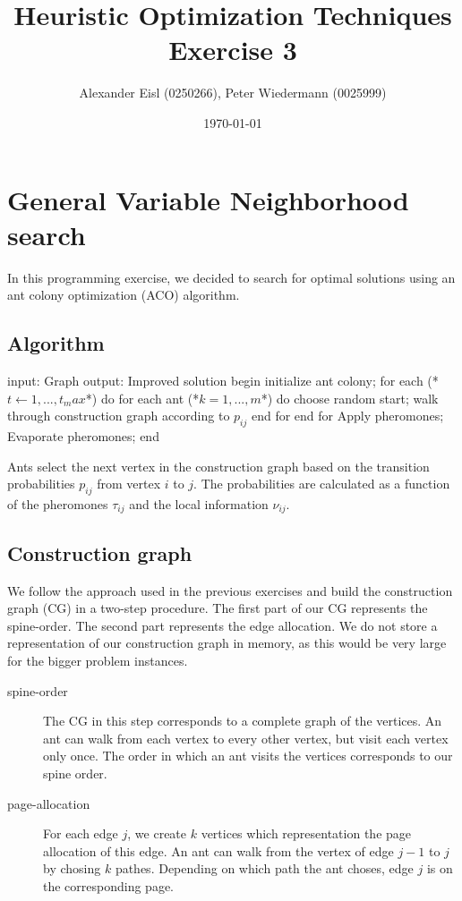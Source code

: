 \documentclass{scrartcl}
\author{Alexander Eisl (0250266), Peter Wiedermann (0025999)}
\date{\today}
\title{Heuristic Optimization Techniques \\ Exercise 3}
\begin{document}
\maketitle


\section{General Variable Neighborhood search}
\label{sec:general_vns}

In this programming exercise, we decided to search for optimal
solutions using an ant colony optimization (ACO) algorithm.


\subsection{Algorithm}

\begin{algorithm}[caption={Local search}]
    input: Graph 
    output: Improved solution
    begin
        initialize ant colony;
        for each (*$t \leftarrow 1,...,t_max$*) do
      	    for each ant (*$k = 1,...,m$*) do
               choose random start;
               walk through construction graph according to $p_{ij}$
            end for
        end for
        Apply pheromones;
        Evaporate pheromones;
    end
\end{algorithm}

Ants select the next vertex in the construction graph based on the
transition probabilities $p_{ij}$ from vertex $i$ to $j$. The
probabilities are calculated as a function of the pheromones
$\tau_{ij}$ and the local information $\nu_{ij}$.



\subsection{Construction graph}
\label{construction_graph}
We follow the approach used in the previous exercises and build the
construction graph (CG) in a two-step procedure. The first part of our
CG represents the spine-order. The second part represents the edge
allocation. We do not store a representation of our construction graph
in memory, as this would be very large for the bigger problem
instances.

\begin{description}
  \item[spine-order] The CG in this step corresponds to a complete
    graph of the vertices. An ant can walk from each vertex to every other vertex, but
    visit each vertex only once. The order in which an ant visits the vertices
    corresponds to our spine order.

  \item[page-allocation] For each edge $j$, we create $k$ vertices
    which representation the page allocation of this edge. An ant can
    walk from the vertex of edge $j-1$ to $j$ by chosing $k$
    pathes. Depending on which path the ant choses, edge $j$ is on the
    corresponding page.
\end{description}
\end{document}
